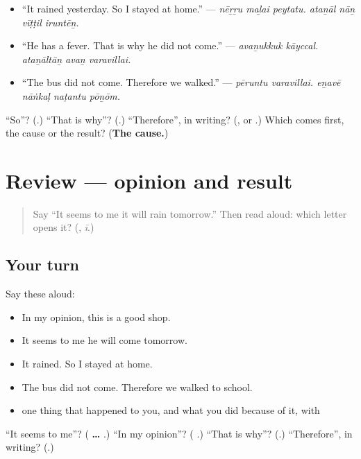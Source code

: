\begin{itemize}
\raggedright
  \item \textquotedblleft{}It rained yesterday. So I stayed at home.\textquotedblright{} — \emph{nēṟṟu maḻai peytatu. ataṉāl nāṉ vīṭṭil iruntēṉ.}
  \item \textquotedblleft{}He has a fever. That is why he did not come.\textquotedblright{} — \emph{avaṉukkuk kāyccal. ataṉāltāṉ avaṉ varavillai.}
  \item \textquotedblleft{}The bus did not come. Therefore we walked.\textquotedblright{} — \emph{pēruntu varavillai. eṉavē nāṅkaḷ naṭantu pōṉōm.}
\end{itemize}

\begin{tcolorbox}[breakable,colback=teal!4,colframe=teal!35!black,title={Before you move on}]
\textquotedblleft{}So\textquotedblright{}? (\textbf{}.) \textquotedblleft{}That is why\textquotedblright{}? (\textbf{}.) \textquotedblleft{}Therefore\textquotedblright{}, in writing? (\textbf{}, or \textbf{}.) Which comes first, the cause or the result? (\textbf{The cause.})
\end{tcolorbox}
\section[(review)]{Review — opinion and result}

\label{lesson:TA-R286-opinion-and-result}



\begin{quote}
Say \textquotedblleft{}It seems to me it will rain tomorrow.\textquotedblright{} Then read \textbf{} aloud: which letter opens it? (\textbf{}, \emph{ī}.)
\end{quote}

\subsection*{Your turn}
Say these aloud:

\begin{itemize}
\raggedright
  \item In my opinion, this is a good shop.
  \item It seems to me he will come tomorrow.
  \item It rained. So I stayed at home.
  \item The bus did not come. Therefore we walked to school.
  \item one thing that happened to you, and what you did because of it, with 
\end{itemize}

\begin{tcolorbox}[breakable,colback=teal!4,colframe=teal!35!black,title={Before you move on}]
\textquotedblleft{}It seems to me\textquotedblright{}? (\textbf{ …  }.) \textquotedblleft{}In my opinion\textquotedblright{}? (\textbf{ }.) \textquotedblleft{}That is why\textquotedblright{}? (\textbf{}.) \textquotedblleft{}Therefore\textquotedblright{}, in writing? (\textbf{}.)
\end{tcolorbox}
